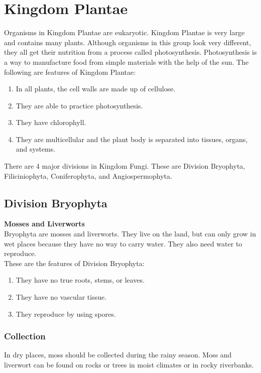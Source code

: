 \section{Kingdom Plantae}
Organisms in Kingdom Plantae are eukaryotic. Kingdom Plantae is very large and contains many plants.
Although organisms in this group look very different, they all get their nutrition from a process called photosynthesis. Photosynthesis is a way to manufacture food from simple materials with the help of the sun.
 The following are features of Kingdom Plantae:
\begin{enumerate}
\item{In all plants, the cell walls are made up of cellulose.}
\item{They are able to practice photosynthesis.}
\item{They have chlorophyll.}
\item{They are multicellular and the plant body is separated into tissues, organs, and systems.}
\end{enumerate}

There are 4 major divisions in Kingdom Fungi. These are Division Bryophyta, Filiciniophyta, Coniferophyta, and Angiospermophyta.
\subsection{Division Bryophyta}
\textbf{Mosses and Liverworts}\\
Bryophyta are mosses and liverworts. They live on the land, but can only grow in wet places because they have no way to carry water. They also need water to reproduce.\\
These are the features of Division Bryophyta:
\begin{enumerate}
\item{They have no true roots, stems, or leaves.}
\item{They have no vascular tissue.}
\item{They reproduce by using spores.}
\end{enumerate}

\subsubsection{Collection}
In dry places, moss should be collected during the rainy season. Moss and liverwort can be found on rocks or trees in moist climates or in rocky riverbanks. 

